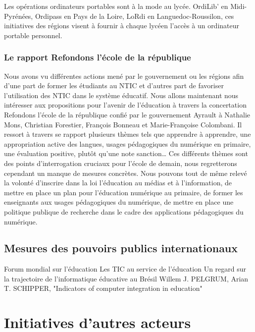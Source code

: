 Les opérations \og{}ordinateurs portables\fg{} sont à la mode au
lycée. OrdiLib' en Midi-Pyrénées, Ordipass en Pays de la Loire, LoRdi
en Languedoc-Roussilon, ces initiatives des régions visent à fournir à
chaque lycéen l'accès à un ordinateur portable personnel.

\cite{portables35}
\cite{portables60}
\cite{portables40}


\subsubsection{Le rapport \og{}Refondons l'école de la république\fg{}}

Nous avons vu différentes actions mené par le gouvernement ou les
régions afin d'une part de former les étudiants au NTIC et d'autres
part de favoriser l'utilisation des NTIC dans le système éducatif. Nous
allons maintenant nous intéresser aux propositions pour l'avenir de
l'éducation à travers la concertation \og{}Refondons l'école de la
république\fg{} confié par le gouvernement Ayrault à Nathalie Mons, Christian
Forestier, François Bonneau et Marie-Françoise Colombani. Il ressort à
travers se rapport plusieurs thèmes tels que \og{}apprendre à
apprendre\fg{}, \og{}une appropriation active des langues\fg{},
\og{}usages pédagogiques du numérique en primaire\fg{}, \og{}une
évaluation positive, plutôt qu'une note sanction\fg{}… Ces différents
thèmes sont des points d'interrogation cruciaux pour l'école de demain,
nous regretterons cependant un manque de mesures concrètes. Nous
pouvons tout de même relevé la volonté d'inscrire dans la loi \og
l'éducation au médias et à l'information\fg{}, de mettre en place un plan
pour l'éducation numérique au primaire, de former les enseignants aux
usages pédagogiques du numérique, de mettre en place une politique
publique de recherche dans le cadre des applications pédagogiques du
numérique.


\subsection{Mesures des pouvoirs publics internationaux}
Forum mondial sur l’éducation \cite{educ_forum}
Les TIC au service de l’éducation \cite{tics}
Un regard sur la trajectoire de l’informatique éducative au Brésil \cite{peixoto2006regard}
Willem J. PELGRUM, Arian T. SCHIPPER, "Indicators of computer integration in education" \cite{pelgrum1993indicators}


\section{Initiatives d'autres acteurs}

